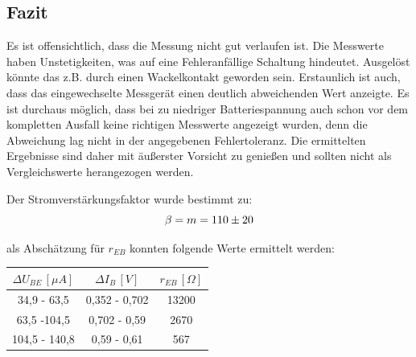 \subsection{Fazit}
Es ist offensichtlich, dass die Messung nicht gut verlaufen ist. Die Messwerte haben Unstetigkeiten, was auf eine Fehleranfällige Schaltung hindeutet. Ausgelöst könnte das z.B. durch einen Wackelkontakt geworden sein. Erstaunlich ist auch, dass das eingewechselte Messgerät einen deutlich abweichenden Wert anzeigte. Es ist durchaus möglich, dass bei zu niedriger Batteriespannung auch schon vor dem kompletten Ausfall keine richtigen Messwerte angezeigt wurden, denn die Abweichung lag nicht in der angegebenen Fehlertoleranz. Die ermittelten Ergebnisse sind daher mit äußerster Vorsicht zu genießen und sollten nicht als Vergleichswerte herangezogen werden. 

Der Stromverstärkungsfaktor wurde bestimmt zu:
\begin{equation}
\beta = m = 110 \pm 20 \notag
\end{equation}

als Abschätzung für \(r_{EB}\) konnten folgende Werte ermittelt werden:

\begin{center}
\begin{tabular}{c|c|c}
\(\Delta U_{BE}\, [\mu A]\) & \(\Delta I_B\, [V]\) &  \(r_{EB}\, [\Omega]\) \\\hline
34,9 - 63,5 & 0,352 - 0,702 & 13200\\
63,5 -104,5 & 0,702 - 0,59 & 2670\\
104,5 - 140,8 & 0,59 - 0,61 & 567
\end{tabular}
\end{center}

